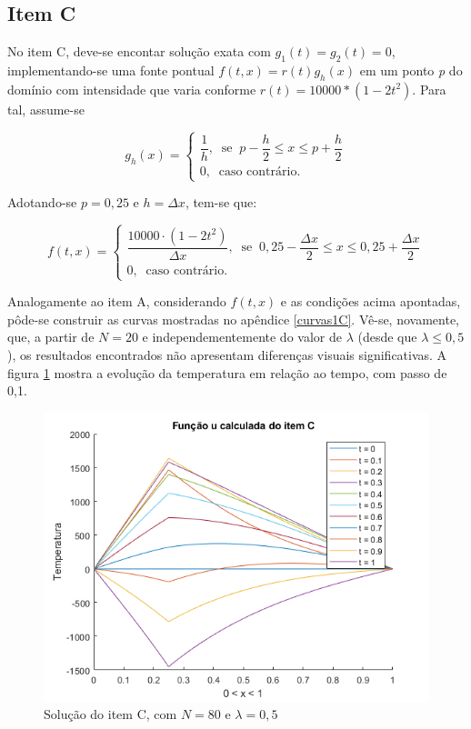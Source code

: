 \documentclass[12pt]{article}
\begin{document}
\begin{spacing}{1.5}
\subsection{Item C}

No item C, deve-se encontar solução exata com $g_{1}(t) = g_{2}(t) = 0$, implementando-se uma fonte pontual $f(t,x) = r(t)g_h(x)$ em um ponto \textit{p} do domínio com intensidade que varia conforme $r(t)=10000*(1-2t^{2})$. Para tal, assume-se

\begin{equation*}\label{regiao_pontual}
g_{h}(x) =\begin{cases}
    \dfrac{1}{h},\;\; \text{se} \;\; p-\dfrac{h}{2} \leq x \leq p + \dfrac{h}{2} \\
    0,\;\; \text{caso contrário.}
\end{cases}
\end{equation*}

Adotando-se $\textit{p} = 0,25$ e $h = \Delta x$, tem-se que:

\begin{equation*}\label{fonte_pontual}
f(t,x) =\begin{cases}
     \dfrac{10000\cdot(1-2t^{2})}{\Delta x},\;\; \text{se} \;\; 0,25-\dfrac{\Delta x}{2} \leq x \leq 0,25 + \dfrac{\Delta x}{2} \\
    0,\;\; \text{caso contrário.}
\end{cases}
\end{equation*}

Analogamente ao item A, considerando $f(t,x)$ e as condições acima apontadas, pôde-se construir as curvas mostradas no apêndice \ref{curvas1C}. Vê-se, novamente, que, a partir de $N=20$ e independementemente do valor de $\lambda$ (desde que $\lambda \leq 0,5$), os resultados encontrados não apresentam diferenças visuais significativas. A figura \ref{fig:itemC_2D} mostra a evolução da temperatura em relação ao tempo, com passo de 0,1.

\begin{figure}[ht!]
    \centering
    \includegraphics[width=0.8\linewidth]{Primeira_Tarefa/ItemC/itemC_2D.png}
    \caption{Solução do item C, com $N=80$ e $\lambda=0,5$}
    \label{fig:itemC_2D}
\end{figure}


\end{spacing}
\end{document}
